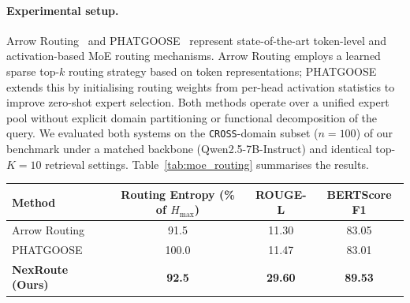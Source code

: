 \documentclass[a4paper,fleql]{cas-sc}
\begin{document}
\paragraph{Experimental setup.}
Arrow Routing~\citep{arrow2024routing} and PHATGOOSE~\citep{muqeeth2024phatgoose}
represent state-of-the-art token-level and activation-based MoE routing mechanisms.
Arrow Routing employs a learned sparse top-$k$ routing strategy based on token
representations; PHATGOOSE extends this by initialising routing weights from
per-head activation statistics to improve zero-shot expert selection. Both methods
operate over a unified expert pool without explicit domain partitioning or functional
decomposition of the query. We evaluated both systems on the \texttt{CROSS}-domain
subset ($n{=}100$) of our benchmark under a matched backbone
(Qwen2.5-7B-Instruct) and identical top-$K{=}10$ retrieval settings.
Table~\ref{tab:moe_routing} summarises the results.

\vspace{6pt plus 4pt minus 3pt}
\begin{center}
\begingroup
{}
\label{tab:moe_routing}
\renewcommand{\arraystretch}{1.3}
\begin{tabular}{lccc}
\toprule
\textbf{Method} & \textbf{Routing Entropy (\% of $H_{\max}$)} & \textbf{ROUGE-L} & \textbf{BERTScore F1} \\
\midrule
Arrow Routing~\citep{arrow2024routing}  & 91.5           & 11.30          & 83.05          \\
PHATGOOSE~\citep{muqeeth2024phatgoose}  & 100.0          & 11.47          & 83.01          \\
\midrule
\textbf{NexRoute (Ours)}               & \textbf{92.5}  & \textbf{29.60} & \textbf{89.53} \\
\bottomrule
\end{tabular}
\endgroup
\end{center}
\vspace{6pt plus 4pt minus 3pt}
\end{document}
